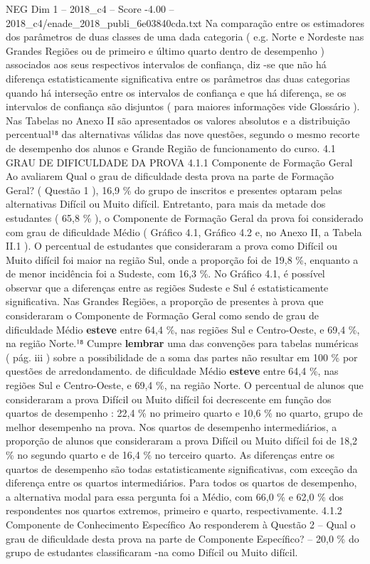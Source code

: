 \begin{textsample}{NEG Dim 1 – 2018\_c4 – Score -4.00 – 2018\_c4/enade\_2018\_publi\_6e03840cda.txt}
Na comparação entre os estimadores dos parâmetros de duas classes de uma dada categoria ( e.g.
Norte e Nordeste nas Grandes Regiões ou de primeiro e último quarto dentro de desempenho ) associados aos seus respectivos intervalos de confiança, diz -se que não há diferença estatisticamente significativa entre os parâmetros das duas categorias quando há interseção entre os intervalos de confiança e que há diferença, se os intervalos de confiança são disjuntos ( para maiores informações vide Glossário ).
Nas Tabelas no Anexo II são apresentados os valores absolutos e a distribuição percentual¹⁸ das alternativas válidas das nove questões, segundo o mesmo recorte de desempenho dos alunos e Grande Região de funcionamento do curso. 4.1 GRAU DE DIFICULDADE DA PROVA 4.1.1 Componente de Formação Geral Ao avaliarem Qual o grau de dificuldade desta prova na parte de Formação Geral? ( Questão 1 ), 16,9 \% do grupo de inscritos e presentes optaram pelas alternativas Difícil ou Muito difícil.
Entretanto, para mais da metade dos estudantes ( 65,8 \% ), o Componente de Formação Geral da prova foi considerado com grau de dificuldade Médio ( Gráfico 4.1, Gráfico 4.2 e, no Anexo II, a Tabela II.1 ).
O percentual de estudantes que consideraram a prova como Difícil ou Muito difícil foi maior na região Sul, onde a proporção foi de 19,8 \%, enquanto a de menor incidência foi a Sudeste, com 16,3 \%.
No Gráfico 4.1, é possível observar que a diferenças entre as regiões Sudeste e Sul é estatisticamente significativa.
Nas Grandes Regiões, a proporção de presentes à prova que consideraram o Componente de Formação Geral como sendo de grau de dificuldade Médio \textbf{esteve} entre 64,4 \%, nas regiões Sul e Centro-Oeste, e 69,4 \%, na região Norte.¹⁸ Cumpre \textbf{lembrar} uma das convenções para tabelas numéricas ( pág. iii ) sobre a possibilidade de a soma das partes não resultar em 100 \% por questões de arredondamento. de dificuldade Médio \textbf{esteve} entre 64,4 \%, nas regiões Sul e Centro-Oeste, e 69,4 \%, na região Norte.
O percentual de alunos que consideraram a prova Difícil ou Muito difícil foi decrescente em função dos quartos de desempenho : 22,4 \% no primeiro quarto e 10,6 \% no quarto, grupo de melhor desempenho na prova.
Nos quartos de desempenho intermediários, a proporção de alunos que consideraram a prova Difícil ou Muito difícil foi de 18,2 \% no segundo quarto e de 16,4 \% no terceiro quarto.
As diferenças entre os quartos de desempenho são todas estatisticamente significativas, com exceção da diferença entre os quartos intermediários.
Para todos os quartos de desempenho, a alternativa modal para essa pergunta foi a Médio, com 66,0 \% e 62,0 \% dos respondentes nos quartos extremos, primeiro e quarto, respectivamente. 4.1.2 Componente de Conhecimento Específico Ao responderem à Questão 2 – Qual o grau de dificuldade desta prova na parte de Componente Específico? – 20,0 \% do grupo de estudantes classificaram -na como Difícil ou Muito difícil.

\end{textsample}
